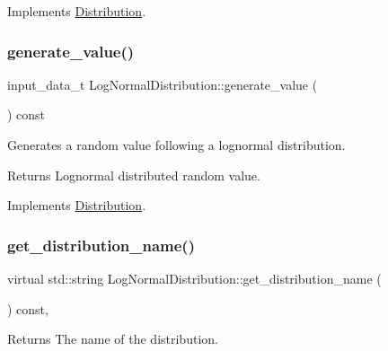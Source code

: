 Implements \hyperlink{classDistribution_a5146d1193531b15a872d401cb97f06ca}{Distribution}.

\mbox{\label{classLogNormalDistribution_a3c4f651b46cfec8372671ab32889a0c7}} 
\subsubsection{\texorpdfstring{generate\+\_\+value()}{generate\_value()}}
{\footnotesize\ttfamily input\+\_\+data\+\_\+t Log\+Normal\+Distribution\+::generate\+\_\+value (\begin{DoxyParamCaption}{ }\end{DoxyParamCaption}) const\hspace{0.3cm}{\ttfamily [virtual]}}

Generates a random value following a lognormal distribution. \begin{DoxyReturn}{Returns}
Lognormal distributed random value. 
\end{DoxyReturn}


Implements \hyperlink{classDistribution_a096af8a5e59bd38e0ad7da10632e0c83}{Distribution}.

\mbox{\label{classLogNormalDistribution_a05e474accd65f523749011fbc8b42b65}} 
\subsubsection{\texorpdfstring{get\+\_\+distribution\+\_\+name()}{get\_distribution\_name()}}
{\footnotesize\ttfamily virtual std\+::string Log\+Normal\+Distribution\+::get\+\_\+distribution\+\_\+name (\begin{DoxyParamCaption}{ }\end{DoxyParamCaption}) const\hspace{0.3cm}{\ttfamily [inline]}, {\ttfamily [virtual]}}

\begin{DoxyReturn}{Returns}
The name of the distribution. 
\end{DoxyReturn}


